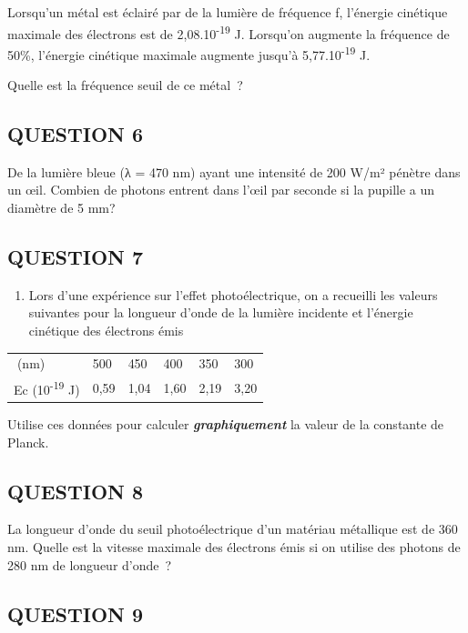 {{{Lorsqu'un métal est éclairé par de la lumière de fréquence f, l'énergie
cinétique maximale des électrons est de 2,08.10\textsuperscript{-19} J.
Lorsqu'on augmente la fréquence de 50\%, l'énergie cinétique maximale
augmente jusqu'à 5,77.10\textsuperscript{-19} J.

Quelle est la fréquence seuil de ce métal~?

\subsection{QUESTION 6}

De la lumière bleue (λ = 470 nm) ayant une intensité de 200 W/m² pénètre
dans un œil. Combien de photons entrent dans l'œil par seconde si la
pupille a un diamètre de 5 mm?

\subsection{QUESTION 7}\label{question-7}

\begin{enumerate}
\item  Lors d'une expérience sur l'effet photoélectrique, on a recueilli les
  valeurs suivantes pour la longueur d'onde de la lumière incidente et
  l'énergie cinétique des électrons émis
\end{enumerate}

\begin{longtable}[]{@{}llllll@{}}
\toprule
\endhead
(nm) & 500 & 450 & 400 & 350 & 300\tabularnewline
Ec (10\textsuperscript{-19} J) & 0,59 & 1,04 & 1,60 & 2,19 &
3,20\tabularnewline
\bottomrule
\end{longtable}

Utilise ces données pour calculer \emph{\textbf{graphiquement}} la
valeur de la constante de Planck.

\subsection{QUESTION 8}

La longueur d'onde du seuil photoélectrique d'un matériau métallique est
de 360 nm. Quelle est la vitesse maximale des électrons émis si on
utilise des photons de 280 nm de longueur d'onde~?

\subsection{QUESTION 9}

}}}
